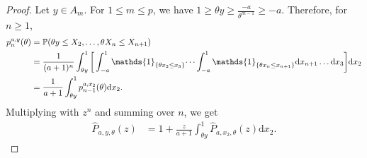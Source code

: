 \documentclass[12pt]{article}
\renewcommand{\P}{\mathbb{P}} %
\newcommand{\1}{\mathds{1}}
\renewcommand{\d}{\mathrm{d}}
\theoremstyle{definition}
\theoremstyle{plain}
\theoremstyle{remark}
\begin{document}
\begin{proof}
Let $y\in A_m$. For $1\le m\le p$, we have $1\ge\theta y\ge\frac{-a}{\theta^{m-1}}\ge-a$. Therefore, for $n\ge 1$,
\begin{align*}
     p_{n}^{a,y}(\theta)
     &=\P(\theta y\leq  X_2,\dots,\theta X_n\leq X_{n+1}) \notag
    \\&=\frac{1}{(a+1)^n}\int_{\theta y}^1\bigg[\int_{-a}^1\mathds{1}_{\{\theta x_{2}\leq x_{3}\}}\dots
  \int_{-a}^1\mathds{1}_{\{\theta x_{n}\leq x_{n+1}\}}\d x_{n+1}\dots \d x_3\bigg]\d x_2\notag
  \\&=\frac{1}{a+1}\int_{\theta y}^1 p_{n-1}^{a,x_2}(\theta)\d x_2.\notag
 \end{align*}
  Multiplying with $z^n$ and summing over $n$, we get
 \begin{align}
     \hat{P}_{a,y,\theta}(z)
       &=1+\frac{z}{a+1}\int_{\theta y}^1\hat{P}_{a,x_2,\theta}(z)\d x_2\label{eqn:orange:integralequationhatp}.
 \end{align}

\end{proof}
\end{document}
